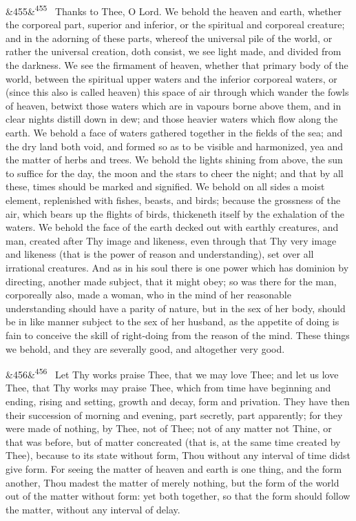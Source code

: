 \documentclass[12pt]{article}
\newcommand{\para}[1][]{\par\noindent\ifx&#1&\else\textsuperscript{\footnotesize #1}~\fi}
\begin{document}
\para[455] Thanks to Thee, O Lord. We behold the heaven and earth, whether the corporeal part, superior and inferior, or the spiritual and corporeal creature; and in the adorning of these parts, whereof the universal pile of the world, or rather the universal creation, doth consist, we see light made, and divided from the darkness. We see the firmament of heaven, whether that primary body of the world, between the spiritual upper waters and the inferior corporeal waters, or (since this also is called heaven) this space of air through which wander the fowls of heaven, betwixt those waters which are in vapours borne above them, and in clear nights distill down in dew; and those heavier waters which flow along the earth. We behold a face of waters gathered together in the fields of the sea; and the dry land both void, and formed so as to be visible and harmonized, yea and the matter of herbs and trees. We behold the lights shining from above, the sun to suffice for the day, the moon and the stars to cheer the night; and that by all these, times should be marked and signified. We behold on all sides a moist element, replenished with fishes, beasts, and birds; because the grossness of the air, which bears up the flights of birds, thickeneth itself by the exhalation of the waters. We behold the face of the earth decked out with earthly creatures, and man, created after Thy image and likeness, even through that Thy very image and likeness (that is the power of reason and understanding), set over all irrational creatures. And as in his soul there is one power which has dominion by directing, another made subject, that it might obey; so was there for the man, corporeally also, made a woman, who in the mind of her reasonable understanding should have a parity of nature, but in the sex of her body, should be in like manner subject to the sex of her husband, as the appetite of doing is fain to conceive the skill of right-doing from the reason of the mind. These things we behold, and they are severally good, and altogether very good.

\para[456] Let Thy works praise Thee, that we may love Thee; and let us love Thee, that Thy works may praise Thee, which from time have beginning and ending, rising and setting, growth and decay, form and privation. They have then their succession of morning and evening, part secretly, part apparently; for they were made of nothing, by Thee, not of Thee; not of any matter not Thine, or that was before, but of matter concreated (that is, at the same time created by Thee), because to its state without form, Thou without any interval of time didst give form. For seeing the matter of heaven and earth is one thing, and the form another, Thou madest the matter of merely nothing, but the form of the world out of the matter without form: yet both together, so that the form should follow the matter, without any interval of delay.
\end{document}
